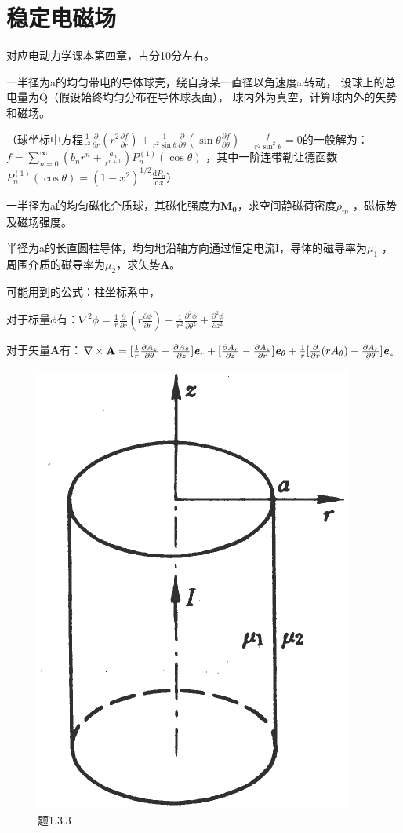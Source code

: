 \section{稳定电磁场}
对应电动力学课本第四章，占分10分左右。

\begin{question}
一半径为a的均匀带电的导体球壳，绕自身某一直径以角速度$\omega$转动，
设球上的总电量为Q（假设始终均匀分布在导体球表面），
球内外为真空，计算球内外的矢势和磁场。

\noindent（球坐标中方程$\frac{1}{r^2}\frac{\partial }{\partial r}(r^2\frac{\partial f}{\partial r})+\frac{1}{r^2 \sin\theta}\frac{\partial }{\partial \theta}(\sin\theta\frac{\partial f}{\partial \theta})-\frac{f}{r^2\sin^2\theta}=0$的一般解为：$f=\sum_{n=0}^{\infty }(b_nr^n+\frac{a_n}{r^{n+1}})P_n^{(1)}(\cos\theta)$
 ，其中一阶连带勒让德函数$P_n^{(1)}(\cos\theta)=(1-x^2)^{1/2}\frac{\mathrm{d}P_n }{\mathrm{d} x}$）
 \end{question}
 
\begin{question}
一半径为a的均匀磁化介质球，其磁化强度为$\mathbf{M_0}$，求空间静磁荷密度$\rho_m$ ，磁标势及磁场强度。
\end{question}

\begin{question}
半径为a的长直圆柱导体，均匀地沿轴方向通过恒定电流I，导体的磁导率为$\mu_1$ ，周围介质的磁导率为$\mu_2$，求矢势$\mathbf{A}$。

\noindent 可能用到的公式：柱坐标系中，

\noindent 对于标量$\phi$有：$\nabla^2\phi=\frac{1}{r}\frac{\partial }{\partial r}(r\frac{\partial \phi}{\partial r})+\frac{1}{r^2 }\frac{\partial^2 \phi}{\partial \theta^2}+\frac{\partial^2\phi}{\partial z^2}$ 

\noindent 对于矢量$\mathbf{A}$有：$\nabla \times \mathbf{A}=[\frac{1}{r}\frac{\partial A_z}{\partial \theta}-\frac{\partial A_\theta}{\partial z}]\textbf{\textit{e}}_r+[\frac{\partial A_r}{\partial z}-\frac{\partial A_z}{\partial r}]\textbf{\textit{e}}_\theta+\frac{1}{r}[\frac{\partial}{\partial r}(rA_\theta)-\frac{\partial A_r}{\partial \theta}]\textbf{\textit{e}}_z$
\begin{figure}[ht]
	\centering
	\includegraphics[height=3 cm]{images/q3_1.png}
	\caption{题1.3.3}
\end{figure}
\end{question}

